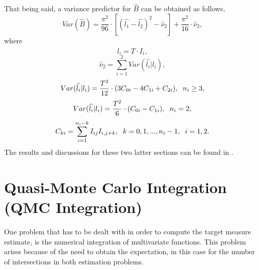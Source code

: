 That being said, a variance predictor for $\widehat{B}$ can be obtained as follows,
\begin{equation*}
    Var(\widehat{B}) = \frac{\pi^2}{96} \cdot [(\widehat{l_1}-\widehat{l_2})^2-\widehat{\nu}_2] + \frac{\pi^2}{16}\cdot \widehat{\nu}_2,
\end{equation*}
where
\begin{equation*}
    \widehat{l_i} = T \cdot I_i,
\end{equation*}
\begin{equation*}
    \widehat{\nu}_2 = \sum_{i=1}^2 Var(\widehat{l_i}|l_i),
\end{equation*}
\begin{equation*}
    Var(\widehat{l_i}|l_i) = \frac{T^2}{12} \cdot (3C_{0i} - 4C_{1i} + C_{2i}), \hspace{2mm} n_i\geq 3,
\end{equation*}
\begin{equation*}
    Var(\widehat{l_i}|l_i) = \frac{T^2}{6} \cdot (C_{0i} - C_{1i}), \hspace{2mm} n_i = 2,
\end{equation*}
\begin{equation*}
    C_{ki} = \sum_{i=1}^{n_i - k} I_{ij} I_{i,j+k}, \hspace{2mm} k=0,1,...,n_i-1, \hspace{2mm} i=1,2.
\end{equation*}
The results and discussions for these two latter sections can be found in \citep{SterThAppl-2022-07-21.pdf}.

\section{Quasi-Monte Carlo Integration (QMC Integration)}

One problem that has to be dealt with in order to compute the target measure estimate, is the numerical integration of multivariate functions. This problem arises because of the need to obtain the expectation, in this case for the number of intersections in both estimation problems.\\

